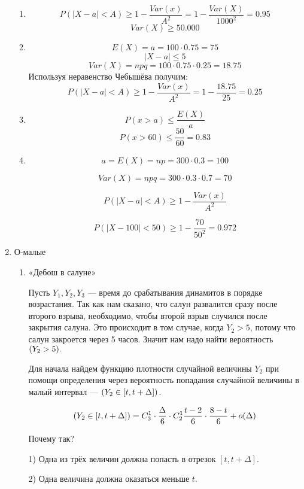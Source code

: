 \documentclass[11pt, a4paper]{article}
\let\P\relax
\DeclareMathOperator{\P}{\mathbb{P}}
\renewcommand{\leq}{\leqslant}
\renewcommand{\geq}{\geqslant}
\theoremstyle{definition}
\begin{document}
\begin{enumerate}
\begin{enumerate}
    \item \[ P(|X - a| < A) \geq 1 - \frac{Var(x)}{A^2} = 1 - \frac{Var(X)}{1000^2} = 0.95
    \]
    \[
    Var(X) \geq 50.000
    \]
    
    \item \[E(X) = a = 100 \cdot 0.75 = 75
    \]
    \[ |X - a| \leq 5
    \]
    \[ Var(X) = npq = 100 \cdot 0.75 \cdot 0.25 = 18.75
    \]
    Используя неравенство Чебышёва получим:
    \[ P(|X - a| < A) \geq 1 - \frac{Var(x)}{A^2} = 1 - \frac{18.75}{25} = 0.25
    \]
    
    \item
     \[
    P(x > a) \leq \frac{E(X)}{a}
    \]
    \[
    P(x > 60) \leq \frac{50}{60} = 0.83
    \]
    \item 
    \[
    a = E(X) = np = 300 \cdot 0.3 = 100
    \]
    
    \[
    Var(X) = npq = 300 \cdot 0.3 \cdot 0.7 = 70
    \]
    
    \[ 
    P(|X - a| < A) \geq 1 - \frac{Var(x)}{A^2} 
    \]
    
    \[
    P(|X - 100| < 50) \geq 1 - \frac{70}{50^2} = 0.972 
    \]
\end{enumerate}    

    \item О-малые

\begin{enumerate}
    \item «Дебош в салуне»
    
    Пусть $Y_1, Y_2, Y_3$ — время до срабатывания динамитов в порядке возрастания. Так как нам сказано, что салун развалится сразу после второго взрыва, необходимо, чтобы второй взрыв случился после закрытия салуна. Это происходит в том случае, когда $Y_2 > 5$, потому что салун закроется через 5 часов. Значит нам надо найти вероятность $\P(Y_2 > 5).$
    
    Для начала найдем функцию плотности случайной величины $Y_2$ при помощи определения через вероятность попадания случайной величины в малый интервал — $\P(Y_2 \in [t, t + \Delta])$.
    
    \[ 
    \P(Y_2 \in [t, t + \Delta]) = C_3^1 \cdot \frac{\Delta }{6}  \cdot C_2^1 \frac{t-2}{6} \cdot \frac{8-t}{6} + o(\Delta)
    \] 
    
    Почему так?
    
    1) Одна из трёх величин должна попасть в отрезок $[t, t + \Delta]$.
    
    2) Одна величина должна оказаться меньше $t$.
    

\end{enumerate}
\end{enumerate}
\end{document}
